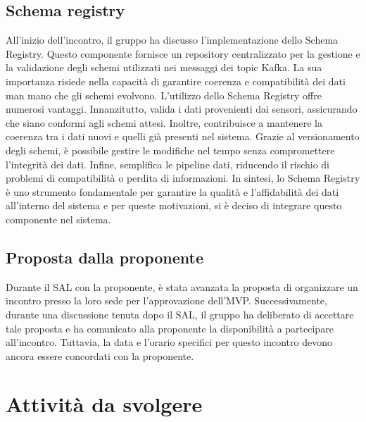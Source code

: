 \documentclass{article}
\begin{document}
\subsection{Schema registry}
All’inizio dell’incontro, il gruppo ha discusso l’implementazione dello Schema Registry. Questo componente fornisce un repository centralizzato per la gestione e la validazione degli schemi utilizzati nei messaggi dei topic Kafka. La sua importanza risiede nella capacità di garantire coerenza e compatibilità dei dati man mano che gli schemi evolvono.
L’utilizzo dello Schema Registry offre numerosi vantaggi. Innanzitutto, valida i dati provenienti dai sensori, assicurando che siano conformi agli schemi attesi. Inoltre, contribuisce a mantenere la coerenza tra i dati nuovi e quelli già presenti nel sistema. Grazie al versionamento degli schemi, è possibile gestire le modifiche nel tempo senza compromettere l’integrità dei dati. Infine, semplifica le pipeline dati, riducendo il rischio di problemi di compatibilità o perdita di informazioni.
In sintesi, lo Schema Registry è uno strumento fondamentale per garantire la qualità e l’affidabilità dei dati all’interno del sistema e per queste motivazioni, si è deciso di integrare questo componente nel sistema.
\subsection{Proposta dalla proponente}
Durante il SAL con la proponente, è stata avanzata la proposta di organizzare un incontro presso la loro sede per l’approvazione dell’MVP. Successivamente, durante una discussione tenuta dopo il SAL, il gruppo ha deliberato di accettare tale proposta e ha comunicato alla proponente la disponibilità a partecipare all’incontro. Tuttavia, la data e l’orario specifici per questo incontro devono ancora essere concordati con la proponente. 
\section{Attività da svolgere}
\end{document}
